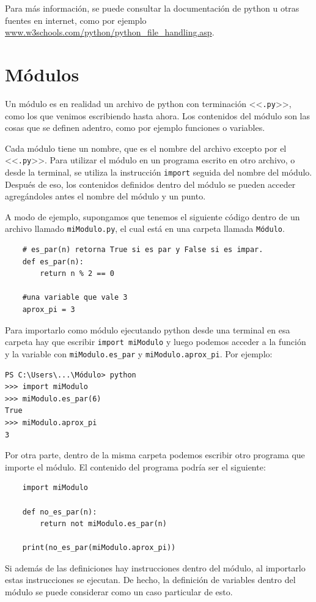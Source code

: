 \documentclass[a4paper, 12pt]{report}
\theoremstyle{definition}
\begin{document}
Para más información, se puede consultar la documentación de python u otras fuentes en internet, como por ejemplo \href{https://www.w3schools.com/python/python_file_handling.asp}{www.w3schools.com/python/python\_file\_handling.asp}.
\section{Módulos}\label{sec-modulos}

Un módulo es en realidad un archivo de python con terminación <<{\tt .py}>>, como los que venimos escribiendo hasta ahora. Los contenidos del módulo son las cosas que se definen adentro, como por ejemplo funciones o variables.

Cada módulo tiene un nombre, que es el nombre del archivo excepto por el <<{\tt .py}>>. Para utilizar el módulo en un programa escrito en otro archivo, o desde la terminal, se utiliza la instrucción {\tt import} seguida del nombre del módulo. Después de eso, los contenidos definidos dentro del módulo se pueden acceder agregándoles antes el nombre del módulo y un punto.

A modo de ejemplo, supongamos que tenemos el siguiente código dentro de un archivo llamado {\tt miModulo.py}, el cual está en una carpeta llamada {\tt Módulo}.
\begin{verbatim}
	# es_par(n) retorna True si es par y False si es impar.
	def es_par(n):
	    return n % 2 == 0
	
	#una variable que vale 3
	aprox_pi = 3
\end{verbatim}
Para importarlo como módulo ejecutando python desde una terminal en esa carpeta hay que escribir {\tt import miModulo} y luego podemos acceder a la función y la variable con {\tt miModulo.es\_par} y {\tt miModulo.aprox\_pi}. Por ejemplo:
\begin{verbatim}
PS C:\Users\...\Módulo> python
>>> import miModulo
>>> miModulo.es_par(6)
True
>>> miModulo.aprox_pi
3
\end{verbatim}
Por otra parte, dentro de la misma carpeta podemos escribir otro programa que importe el módulo. El contenido del programa podría ser el siguiente:
\begin{verbatim}
	import miModulo
	
	def no_es_par(n):
	    return not miModulo.es_par(n)
	
	print(no_es_par(miModulo.aprox_pi))
\end{verbatim}

Si además de las definiciones hay instrucciones dentro del módulo, al importarlo estas instrucciones se ejecutan. De hecho, la definición de variables dentro del módulo se puede considerar como un caso particular de esto.
\end{document}
